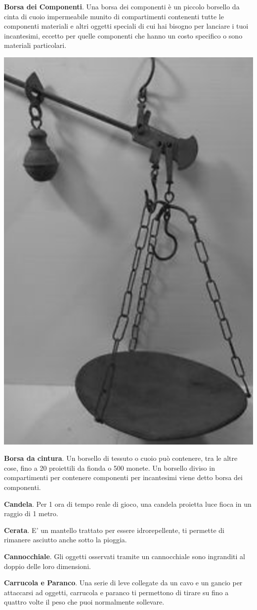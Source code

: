 \begin{multicols}{2}
\textbf{Borsa dei Componenti}\label{Borsa dei Componenti}\hypertarget{Borsa dei Componenti}{}. Una borsa dei componenti è un piccolo borsello da cinta di cuoio impermeabile munito di compartimenti contenenti tutte le componenti materiali e altri oggetti speciali di cui hai bisogno per lanciare i tuoi incantesimi, eccetto per quelle componenti che hanno un costo specifico o sono materiali particolari.


\begin{center}
	\includegraphics[height=0.8\linewidth]{immagini/stadera.png}
\end{center}

\textbf{Borsa da cintura}. Un borsello di tessuto o cuoio può contenere, tra le altre cose, fino a 20 proiettili da fionda o 500 monete. Un borsello diviso in compartimenti per contenere componenti per incantesimi viene detto borsa dei componenti.

\textbf{Candela}\hypertarget{Candela}{}\label{Candela}. Per 1 ora di tempo reale di gioco, una candela proietta luce fioca in un raggio di 1 metro.

\textbf{Cerata}. E' un mantello trattato per essere idrorepellente, ti permette di rimanere asciutto anche sotto la pioggia.

\textbf{Cannocchiale}. Gli oggetti osservati tramite un cannocchiale sono ingranditi al doppio delle loro dimensioni.

\textbf{Carrucola e Paranco}. Una serie di leve collegate da un cavo e un gancio per attaccarsi ad oggetti, carrucola e paranco ti permettono di tirare su fino a quattro volte il peso che puoi normalmente sollevare.\label{Carrucola e Paranco}\hypertarget{Carrucola e paranco}{}


\end{multicols}
